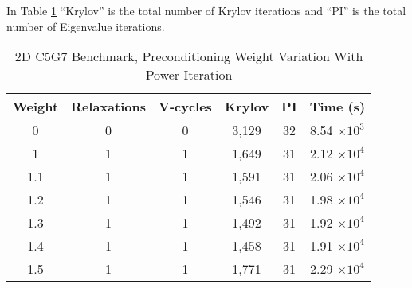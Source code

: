 In Table \ref{table:2D c5g7} ``Krylov'' is the total number of Krylov iterations and ``PI'' is the total number of Eigenvalue iterations. 
%
\begin{table}[!h]
\caption{2D C5G7 Benchmark, Preconditioning Weight Variation With Power Iteration}
\begin{center}
\begin{tabular}{c c c c c c}
\hline
Weight & Relaxations & V-cycles & Krylov & PI & Time (s) \\[0.5ex]
\hline
0    & 0 & 0 & 3,129 & 32 & 8.54 $\times 10^{3}$ \\
1    & 1 & 1 & 1,649 & 31 & 2.12 $\times 10^{4}$ \\
1.1 & 1 & 1 & 1,591 & 31 & 2.06 $\times 10^{4}$ \\
1.2 & 1 & 1 & 1,546 & 31 & 1.98 $\times 10^{4}$ \\
1.3 & 1 & 1 & 1,492 & 31 & 1.92 $\times 10^{4}$ \\
1.4 & 1 & 1 & 1,458 & 31 & 1.91 $\times 10^{4}$ \\
1.5 & 1 & 1 & 1,771 & 31 & 2.29 $\times 10^{4}$ \\
\hline 
\end{tabular} 
\end{center}
\label{table:2D c5g7}
\end{table}

